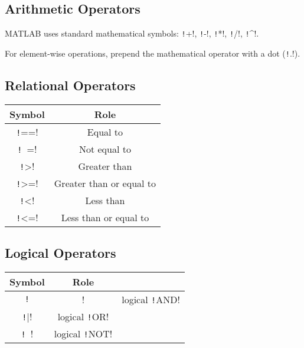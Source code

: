 \documentclass{article}
\begin{document}
\subsection*{Arithmetic Operators}
MATLAB uses standard mathematical symbols: \texttt!+!,
\texttt!-!, \texttt!*!, \texttt!/!,
\texttt!^!.

\noindent For element-wise operations, prepend the mathematical operator with a dot (\texttt!.!).
\begin{multicols}{2}
    \subsection*{Relational Operators}
    \begin{table}[H]
        \centering
        \begin{tabular}{c c}
            \toprule
            \textbf{Symbol}         & \textbf{Role}            \\
            \midrule
            \texttt!==! & Equal to                 \\
            \texttt!~=! & Not equal to             \\
            \texttt!>!  & Greater than             \\
            \texttt!>=! & Greater than or equal to \\
            \texttt!<!  & Less than                \\
            \texttt!<=! & Less than or equal to    \\
            \bottomrule
        \end{tabular}
    \end{table}
    \columnbreak
    \subsection*{Logical Operators}
    \begin{table}[H]
        \centering
        \begin{tabular}{c c}
            \toprule
            \textbf{Symbol}        & \textbf{Role}                                                       \\
            \midrule
            \texttt!   & !                                & logical \texttt!AND! \\
            \texttt!|! & logical \texttt!OR!                                     \\
            \texttt!~! & logical \texttt!NOT!                                    \\
            \bottomrule
        \end{tabular}
    \end{table}
\end{multicols}
\end{document}
